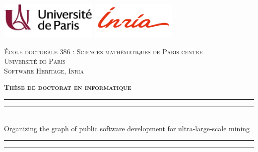 \begin{titlingpage}
\begin{SingleSpace}
\calccentering{\unitlength}

\includegraphics[height=1.8cm]{frontmatter/uni_paris.jpg}  \hfill
\includegraphics[height=1.8cm]{frontmatter/inria.png} \hfill
{}

\begin{center}

    \textsc{École doctorale 386 : Sciences mathématiques de Paris centre}\\
\vspace{2mm}
\textsc{Université de Paris}\\
\vspace{2mm}
\textsc{Software Heritage, Inria}\\

\vspace{4mm}

\textsc{\Large \textbf{Thèse de doctorat en informatique}}\\

\vspace*{2mm}

\rule[0.5ex]{\linewidth}{2pt}\vspace*{-\baselineskip}\vspace*{3.2pt}
\rule[0.5ex]{\linewidth}{1pt}\\[\baselineskip]
\vspace{-0.35cm}
{\huge Organizing the graph of public software development for ultra-large-scale mining}\\
\rule[0.5ex]{\linewidth}{1pt}\vspace*{-\baselineskip}\vspace*{3.4pt}
\rule[0.5ex]{\linewidth}{2pt}\\

\vspace{2mm}


\end{center}
\end{SingleSpace}
\end{titlingpage}
